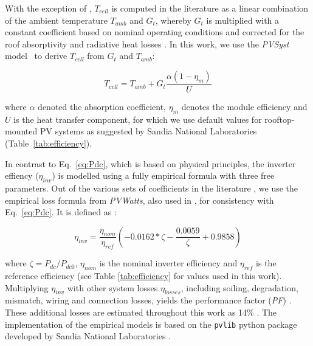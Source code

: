 With the exception of \cite{calcabrini_simplified_2019}, $T_\mathit{cell}$ is computed in the literature as a linear combination of the ambient temperature $T_\mathit{amb}$ and $G_t$, whereby $G_t$ is multiplied with a constant coefficient based on nominal operating conditions and corrected for the roof absorptivity and radiative heat losses \cite{jakubiec_method_2013}.
%
In this work, we use the \textit{PVSyst} model~\cite{faiman_assessing_2008} to derive $T_\mathit{cell}$ from $G_t$ and $T_\mathit{amb}$:

\begin{equation}
    T_\mathit{cell} = T_\mathit{amb} + G_t \frac{\alpha (1 - \eta_m)}{U}
\end{equation}

where $\alpha$ denoted the absorption coefficient, $\eta_m$ denotes the module efficiency and $U$ is the heat transfer component, for which we use default values for rooftop-mounted PV systems as suggested by Sandia National Laboratories \cite{holmgren_pvlib_2018} (Table~\ref{tab:efficiency}).

In contrast to Eq.~\ref{eq:Pdc}, which is based on physical principles, the inverter effiency ($\eta_\mathit{inv}$) is modelled using a fully empirical formula with three free parameters. Out of the various sets of coefficients in the literature \cite{mainzer_assessment_2017,lukac_buildings_2014}, we use the empirical loss formula from \textit{PVWatts}, also used in \cite{buffat_scalable_2018}, for consistency with Eq.~\ref{eq:Pdc}. It is defined as \cite{dobos_pvwatts_2014}:

\begin{equation}
\label{eq:inv}
    \eta_{inv} = \frac{\eta_{nom}}{\eta_{ref}} \left( -0.0162 * \zeta - \frac{0.0059}{\zeta} + 0.9858 \right)
\end{equation}

where $\zeta = P_{dc}/P_{dc0}$, $\eta_{nom}$ is the nominal inverter efficiency and $\eta_{ref}$ is the reference efficiency (see Table \ref{tab:efficiency} for values used in this work). 
%
Multiplying  $\eta_{inv}$ with other system losses $\eta_\mathit{losses}$, including soiling, degradation, mismatch, wiring and connection losses, yields the performance factor (\textit{PF}) \cite{klauser_solarpotentialanalyse_2016}. 
These additional losses are estimated throughout this work as 14\% \cite{dobos_pvwatts_2014}. 
The implementation of the empirical models is based on the \texttt{pvlib} python package developed by Sandia National Laboratories \cite{holmgren_pvlib_2018}.

